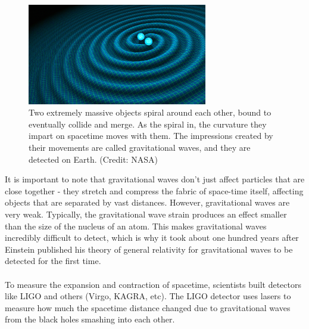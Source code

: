 \documentclass[14pt]{article}
\begin{document}
\begin{figure}[h]
    \centering
    \includegraphics[width=0.7\textwidth]{spacetime_bbh.jpeg}
    \caption{Two extremely massive objects spiral around each other, bound to eventually collide and merge. As the spiral in, the curvature they impart on spacetime moves with them. The impressions created by their movements are called gravitational waves, and they are detected on Earth. (Credit: NASA)}
    \label{fig:spacetime_bbh}
\end{figure}

\noindent It is important to note that gravitational waves don't just affect particles that are close together - they stretch and compress the fabric of space-time itself, affecting objects that are separated by vast distances. However, gravitational waves are very weak. Typically, the gravitational wave strain produces an effect smaller than the size of the nucleus of an atom. This makes gravitational waves incredibly difficult to detect, which is why it took about one hundred years after Einstein published his theory of general relativity for gravitational waves to be detected for the first time.
\\\\
To measure the expansion and contraction of spacetime, scientists built detectors like LIGO and others (Virgo, KAGRA, etc). The LIGO
detector uses lasers to measure how much the spacetime distance changed due to gravitational waves from the black holes smashing into each other.\\
\end{document}

